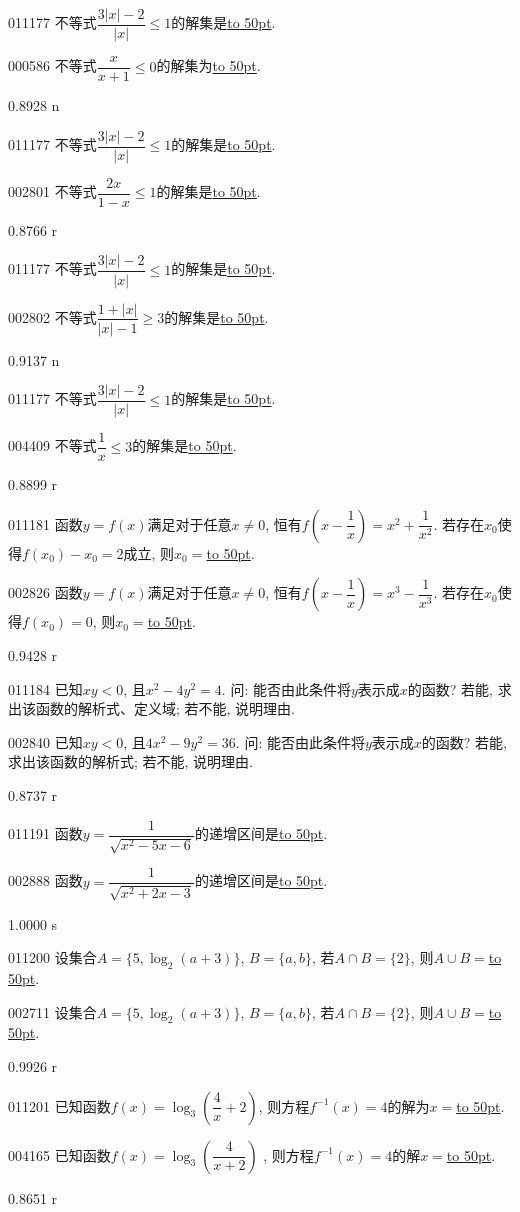 \documentclass[10pt,a4paper]{article}
\newcommand{\blank}[1]{\underline{\hbox to #1pt{}}}
\begin{document}
011177	不等式$\dfrac{3|x|-2}{|x|}\le 1$的解集是\blank{50}.

000586	不等式$\dfrac x{x+1}\le 0$的解集为\blank{50}.

0.8928 n

011177	不等式$\dfrac{3|x|-2}{|x|}\le 1$的解集是\blank{50}.

002801	不等式$\dfrac{2x}{1-x}\le 1$的解集是\blank{50}.

0.8766 r

011177	不等式$\dfrac{3|x|-2}{|x|}\le 1$的解集是\blank{50}.

002802	不等式$\dfrac{1+|x|}{|x|-1}\ge 3$的解集是\blank{50}.

0.9137 n

011177	不等式$\dfrac{3|x|-2}{|x|}\le 1$的解集是\blank{50}.

004409	不等式$\dfrac 1x\le 3$的解集是\blank{50}.

0.8899 r

011181	函数$y=f(x)$满足对于任意$x\ne 0$, 恒有$f(x-\dfrac 1x)=x^2+\dfrac 1{x^2}$. 若存在$x_0$使得$f(x_0)-x_0=2$成立, 则$x_0=$\blank{50}.

002826	函数$y=f(x)$满足对于任意$x\ne 0$, 恒有$f(x-\dfrac 1x)=x^3-\dfrac 1{x^3}$. 若存在$x_0$使得$f(x_0)=0$, 则$x_0=$\blank{50}.

0.9428 r

011184	已知$xy<0$, 且$x^2-4y^2=4$. 问: 能否由此条件将$y$表示成$x$的函数? 若能, 求出该函数的解析式、定义域; 若不能, 说明理由.

002840	已知$xy<0$, 且$4x^2-9y^2=36$. 问: 能否由此条件将$y$表示成$x$的函数? 若能, 求出该函数的解析式; 若不能, 说明理由.

0.8737 r

011191	函数$y=\dfrac 1{\sqrt {x^2-5x-6}}$的递增区间是\blank{50}.

002888	函数$y=\dfrac 1{\sqrt{x^2+2x-3}}$的递增区间是\blank{50}.

1.0000 s

011200	设集合$A=\{5, \log_2(a+3)\}$, $B=\{a,b\}$, 若$A\cap B=\{2\}$, 则$A\cup B=$\blank{50}.

002711	设集合$A=\{5,\log_2(a+3)\}$, $B=\{a,b\}$, 若$A\cap B=\{2\}$, 则$A\cup B=$\blank{50}.

0.9926 r

011201	已知函数$f(x)=\log_3(\dfrac 4x+2)$, 则方程$f^{-1}(x)=4$的解为$x=$\blank{50}.

004165	已知函数$f(x)=\log_3(\dfrac 4{x+2})$ , 则方程$f^{-1}(x)=4$的解$x=$\blank{50}.

0.8651 r
\end{document}
